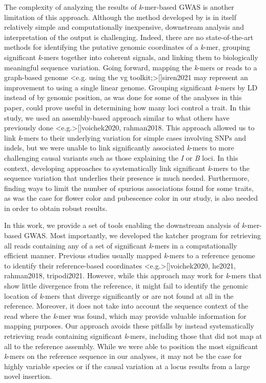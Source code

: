 \documentclass{article}
\providecommand{\DIFaddend}{} %
\DeclareRobustCommand{\DIFaddend}{\DIFOaddend \let\includegraphics\DIFOincludegraphics} %
\begin{document}
\DIFaddend The complexity of analyzing the results of \emph{k}-mer-based GWAS is another
limitation of this approach. Although the method developed by
 is in itself relatively simple and computationally
inexpensive, downstream analysis and interpretation of the output is
challenging. Indeed, there are no state-of-the-art methods for identifying the
putative genomic coordinates of a \emph{k}-mer, grouping significant
\emph{k}-mers together into coherent signals, and linking them to biologically
meaningful sequence variation. Going forward, mapping the \emph{k}-mers or
reads to a graph-based genome \shortcite<e.g. using the vg toolkit;>[]{siren2021}
may represent an improvement to using a single linear genome.  Grouping
significant \emph{k}-mers by LD instead of by genomic position, as was done for
some of the analyses in this paper, could prove useful in determining how many
loci control a trait. In this study, we used an assembly-based approach similar
to what others have previously done \shortcite<e.g.>[]{voichek2020, rahman2018}.
This approach allowed us to link \emph{k}-mers to their underlying variation
for simple cases involving SNPs and indels, but we were unable to link
significantly associated \emph{k}-mers to more challenging causal variants such
as those explaining the \emph{I} or \emph{B} loci. In this context, developing
approaches to systematically link significant \emph{k}-mers to the sequence
variation that underlies their presence is much needed. Furthermore, finding
ways to limit the number of spurious associations found for some traits, as was
the case for flower color and pubescence color in our study, is also needed in
order to obtain robust results.

In this work, we provide a set of tools enabling the downstream analysis of
\emph{k}-mer-based GWAS. Most importantly, we developed the katcher program for
retrieving all reads containing any of a set of significant \emph{k}-mers in a
computationally efficient manner. Previous studies usually mapped \emph{k}-mers
to a reference genome to identify their reference-based coordinates
\shortcite<e.g.>[]{voichek2020, he2021, rahman2018, tripodi2021}.  However, while
this approach may work for \emph{k}-mers that show little divergence from the
reference, it might fail to identify the genomic location of \emph{k}-mers that
diverge significantly or are not found at all in the reference. Moreover, it
does not take into account the sequence context of the read where the
\emph{k}-mer was found, which may provide valuable information for mapping
purposes. Our approach avoids these pitfalls by instead systematically
retrieving reads containing significant \emph{k}-mers, including those that did
not map at all to the reference assembly. While we were able to position the
most significant \emph{k}-mers on the reference sequence in our analyses, it
may not be the case for highly variable species or if the causal variation at a
locus results from a large novel insertion.
\end{document}
